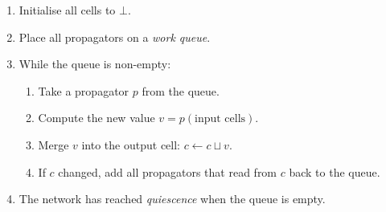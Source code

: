 \documentclass[12pt, a4paper, openright]{book}
\theoremstyle{thmstyle}
\theoremstyle{defstyle}
\begin{document}
\begin{enumerate}
  \item Initialise all cells to $\bot$.
  \item Place all propagators on a \emph{work queue}.
  \item While the queue is non-empty:
    \begin{enumerate}
      \item Take a propagator $p$ from the queue.
      \item Compute the new value $v = p(\text{input cells})$.
      \item Merge $v$ into the output cell: $c \leftarrow c \sqcup v$.
      \item If $c$ changed, add all propagators that read from $c$ back to the queue.
    \end{enumerate}
  \item The network has reached \emph{quiescence} when the queue is empty.
\end{enumerate}
\end{document}
